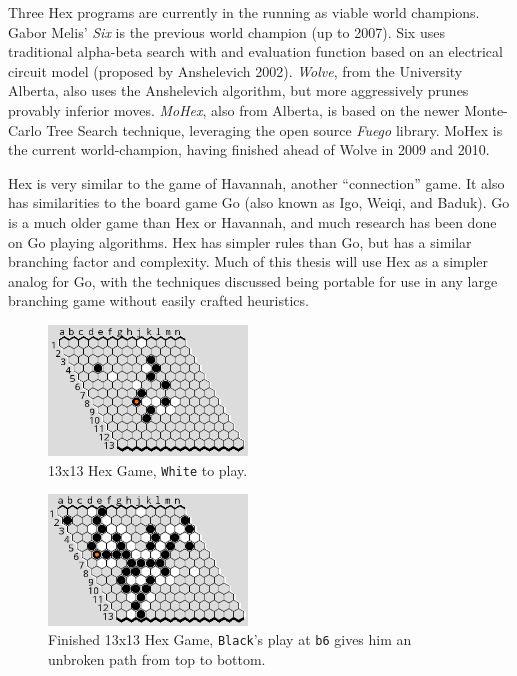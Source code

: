 \documentclass[11pt]{report}
\newcommand{\black}{\texttt{Black}}
\newcommand{\white}{\texttt{White}}
\newcommand{\loc}[1]{\texttt{#1}}
\begin{document}
Three Hex programs are currently in the running as viable world champions. Gabor Melis' \emph{Six} is the previous world champion (up to 2007). Six uses traditional alpha-beta search with and evaluation function based on an electrical circuit model (proposed by Anshelevich 2002)\cite{anshelevich2002hierarchical}. \emph{Wolve}, from the University Alberta, also uses the Anshelevich algorithm, but more aggressively prunes provably inferior moves. \emph{MoHex}, also from Alberta, is based on the newer Monte-Carlo Tree Search technique, leveraging the open source \emph{Fuego} library. MoHex is the current world-champion, having finished ahead of Wolve in 2009 and 2010.

Hex is very similar to the game of Havannah, another ``connection'' game. It also has similarities to the board game Go (also known as Igo, Weiqi, and Baduk). Go is a much older game than Hex or Havannah, and much research has been done on Go playing algorithms. Hex has simpler rules than Go, but has a similar branching factor and complexity. Much of this thesis will use Hex as a simpler analog for Go, with the techniques discussed being portable for use in any large branching game without easily crafted heuristics.

\begin{figure}
	\begin{center}
	\includegraphics[width=200px]{graphics/13x13-in-progress.png}
	\end{center}
	\caption{13x13 Hex Game, \white{} to play.}
	\label{fig:13x13inprogress}
\end{figure}
\begin{figure}
	\begin{center}
	\includegraphics[width=200px]{graphics/13x13-finished.png}
	\end{center}
	\caption{Finished 13x13 Hex Game, \black{}'s play at \loc{b6} gives him an unbroken path from top to bottom.}
	\label{fig:13x13finished}
\end{figure}
\end{document}
